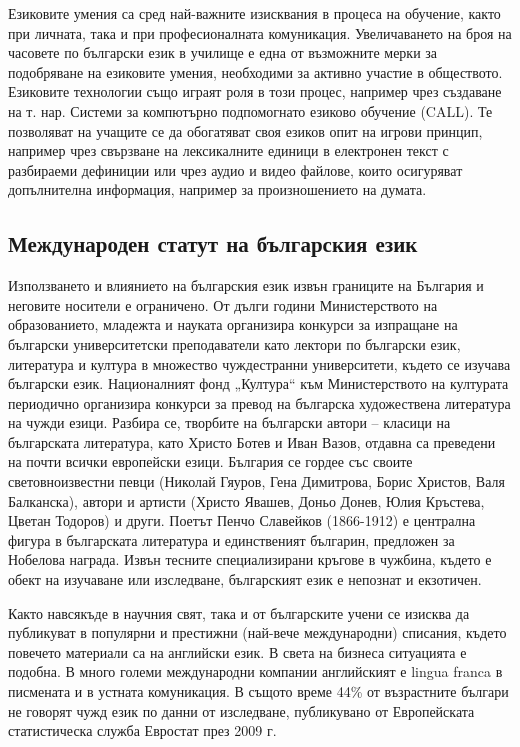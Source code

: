 \documentclass[]{../../metanetpaper}
\begin{document}
\begin{multicols}{2}
Езиковите умения са сред най-важните изисквания в процеса на обучение, както при личната, така и при професионалната комуникация. Увеличаването на броя
 на часовете по български език в училище е една от
 възможните мерки за подобряване на езиковите умения, необходими за активно участие в
 обществото. Езиковите технологии също играят роля в
 този процес, например чрез създаване на т. нар. Системи
 за компютърно подпомогнато езиково обучение (CALL).
 Те позволяват на учащите се да обогатяват своя езиков
 опит на игрови принцип, например чрез свързване на
 лексикалните единици в електронен текст с разбираеми
 дефиниции или
 чрез аудио и видео файлове, които
 осигуряват допълнителна информация, например за произношението на думата. 

\subsection{Международен статут на българския език}

Използването и влиянието на българския език извън границите на България и неговите носители е ограничено. От дълги години Министерството на образованието, младежта и науката организира конкурси за изпращане на български университетски преподаватели като лектори по български език, литература и култура в множество чуждестранни университети, където се изучава български език. Националният фонд „Култура“ към Министерството на културата периодично организира конкурси за превод на българска художествена литература на чужди езици. Разбира се, творбите на български автори -- класици на българската литература, като Христо Ботев и Иван Вазов, отдавна са преведени на почти всички европейски езици. 
България се гордее със своите световноизвестни певци (Николай Гяуров,
 Гена Димитрова, Борис Христов, Валя Балканска), автори и артисти (Христо Явашев, Доньо Донев, Юлия Кръстева, Цветан Тодоров) и други. Поетът Пенчо Славейков (1866-1912) е централна фигура в българската литература и единственият българин, предложен за Нобелова награда. Извън тесните специализирани кръгове в чужбина, където е обект на изучаване или изследване, българският език е непознат и екзотичен. 


Както навсякъде в научния свят, така и от българските учени се изисква да публикуват в популярни и престижни (най-вече международни) списания, където повечето материали са на английски език. В света на бизнеса ситуацията е подобна. В много големи международни компании английският е lingua franca в писмената и в устната комуникация. В същото време 44\% от възрастните българи не говорят чужд език по данни от изследване, публикувано от Европейската статистическа служба Евростат \cite{epp} през 2009 г.


\end{multicols}
\end{document}

